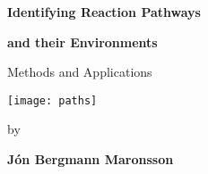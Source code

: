 \begin{titlepage}

%
%


\vspace*{\fill}
\centerline{\LARGE{\textbf{Identifying Reaction Pathways}}}
\vspace{0.5em}
\centerline{\LARGE{\textbf{and their Environments}}}
\vspace{0.5em}
\centerline{Methods and Applications}

\vspace{3em}

\centering
\texttt{[image: paths]}
\vspace{3em}

\centerline{\small{by}}
\vspace{0.5em}
\centerline{\textbf{J\'on Bergmann Maronsson}}
\vspace*{\fill}

\end{titlepage}
